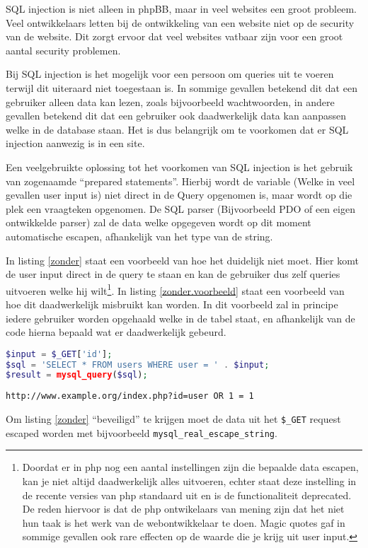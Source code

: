 SQL injection is niet alleen in phpBB, maar in veel websites een groot probleem. Veel ontwikkelaars letten bij de ontwikkeling van een website niet op de security van de website. Dit zorgt ervoor dat veel websites vatbaar zijn voor een groot aantal security problemen.

Bij SQL injection is het mogelijk voor een persoon om queries uit te voeren terwijl dit uiteraard niet toegestaan is. In sommige gevallen betekend dit dat een gebruiker alleen data kan lezen, zoals bijvoorbeeld wachtwoorden, in andere gevallen betekend dit dat een gebruiker ook daadwerkelijk data kan aanpassen welke in de database staan. Het is dus belangrijk om te voorkomen dat er SQL injection aanwezig is in een site.

Een veelgebruikte oplossing tot het voorkomen van SQL injection is het gebruik van zogenaamde ``prepared statements''. Hierbij wordt de variable (Welke in veel gevallen user input is) niet direct in de Query opgenomen is, maar wordt op die plek een vraagteken opgenomen. De SQL parser (Bijvoorbeeld PDO of een eigen ontwikkelde parser) zal de data welke opgegeven wordt op dit moment automatische escapen, afhankelijk van het type van de string.

In listing \ref{zonder} staat een voorbeeld van hoe het duidelijk niet moet. Hier komt de user input direct in de query te staan en kan de gebruiker dus zelf queries uitvoeren welke hij wilt\footnote{Doordat er in php nog een aantal instellingen zijn die bepaalde data escapen, kan je niet altijd daadwerkelijk alles uitvoeren, echter staat deze instelling in de recente versies van php standaard uit\cite{bib.php.magic} en is de functionaliteit deprecated. De reden hiervoor is dat de php ontwikelaars van mening zijn dat het niet hun taak is het werk van de webontwikkelaar te doen. Magic quotes gaf in sommige gevallen ook rare effecten op de waarde die je krijg uit user input.}. In listing \ref{zonder.voorbeeld} staat een voorbeeld van hoe dit daadwerkelijk misbruikt kan worden. In dit voorbeeld zal in principe iedere gebruiker worden opgehaald welke in de tabel staat, en afhankelijk van de code hierna bepaald wat er daadwerkelijk gebeurd.
\begin{lstlisting}[language=php,label=zonder,caption=Zonder escaping, veel gebruikt]
$input = $_GET['id'];
$sql = 'SELECT * FROM users WHERE user = ' . $input;
$result = mysql_query($sql);
\end{lstlisting}
\begin{lstlisting}[label=zonder.voorbeeld,caption=Voorbeeld van misbruiken van niet gescapede data]
http://www.example.org/index.php?id=user OR 1 = 1
\end{lstlisting}
Om listing \ref{zonder} ``beveiligd'' te krijgen moet de data uit het \texttt{\$\_GET} request escaped worden met bijvoorbeeld \texttt{mysql\_real\_escape\_string}. 


